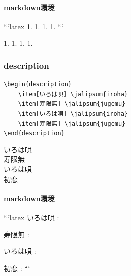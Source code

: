 \documentclass[
    article,
    head_space=25truemm,
    foot_space=10truemm,
    gutter=15truemm]{jlreq}
\begin{document}
\paragraph{markdown環境}

\begin{markdown}
```latex
1. 
1. 
1. 
1. 
```
\end{markdown}

\begin{markdown}
1. 
1. 
1. 
1. 
\end{markdown}


\subsubsection{description}

\begin{verbatim}
\begin{description}
    \item[いろは唄] \jalipsum{iroha}
    \item[寿限無] \jalipsum{jugemu}
    \item[いろは唄] \jalipsum{iroha}
    \item[寿限無] \jalipsum{jugemu}
\end{description}
\end{verbatim}

\begin{description}
    \item[いろは唄] 
    \item[寿限無] 
    \item[いろは唄] 
    \item[初恋] 
\end{description}

\paragraph{markdown環境}

\begin{markdown}
```latex
いろは唄
: 

寿限無
: 

いろは唄
: 

初恋
: 
```
\end{markdown}
\end{document}
